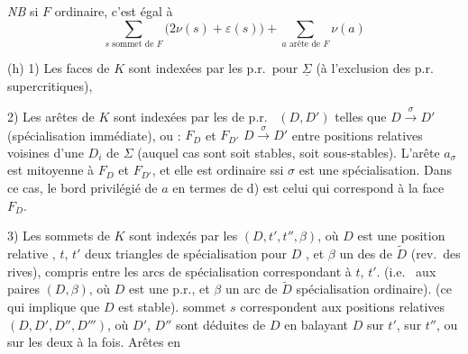 \documentclass[11pt,a4paper]{article}
\begin{document}
\emph{NB} si $F$ ordinaire, c'est égal à
\[
\sum_{s \text{ sommet de } F} \bigl(2\nu(s) + \varepsilon(s)\bigr) + \sum_{a \text{ arête de } F} \nu(a)
\]

(h) 1) Les faces de $K$ sont indexées par les p.r.\ pour $\underline{\Sigma}$ (à l'exclusion des p.r.\  supercritiques),

2) Les arêtes de $K$ sont indexées par les   de p.r.\ \struck{\ill{}} $(D, D')$ telles que $D \xrightarrow{\sigma} D'$ (spécialisation immédiate), \struck{$\underline{\Sigma}$} ou   \struck{\ill{} \ill{} \ill{} \ill{}} : $F_D$ et $F_{D'}$   $D \xrightarrow{\sigma} D'$ entre positions relatives voisines d'une $D_i$ \struck{\ill{}} de $\Sigma$ (auquel cas  sont soit stables, soit sous-stables). L'arête $a_\sigma$ est mitoyenne à $F_D$ et $F_{D'}$, et elle est ordinaire ssi $\sigma$ est une spécialisation. Dans ce cas, le bord privilégié de $a$ en termes de d) est celui qui correspond à la face $F_D$.

3) Les sommets  \struck{\ill{}} de $K$ sont indexés par les   $(D, t', t'', \beta)$, où $D$ est une position relative , $t$, $t'$ deux triangles de spécialisation pour $D$  , et $\beta$ un des    de $\widetilde{D}$ (rev.\ des rives), compris entre les arcs de spécialisation \struck{\ill{}} correspondant à $t$, $t'$. (i.e.\  aux paires $(D, \beta)$, où $D$ est une p.r., et $\beta$ un arc de $\widetilde{D}$ \struck{\ill{}}  spécialisation ordinaire).   (ce qui implique que $D$ est stable).  \struck{\ill{} \ill{}} sommet $s$ correspondent aux positions relatives $(D, D', D'', D''')$, où $D'$, $D''$  \struck{\ill{}} sont déduites  de $D$ en balayant $D$ sur $t'$, \struck{\ill{}} sur $t''$, \struck{\ill{}} ou sur les deux à la fois. Arêtes en 
\end{document}
